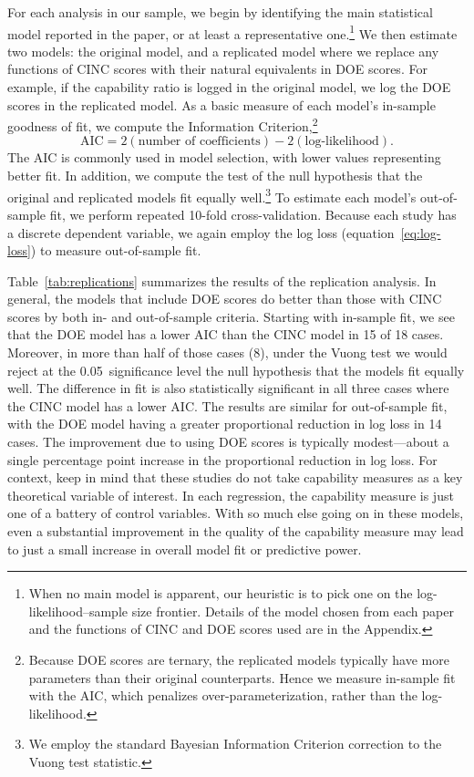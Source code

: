 For each analysis in our sample, we begin by identifying the main statistical model reported in the paper, or at least a representative one.\footnote{
  When no main model is apparent, our heuristic is to pick one on the log-likelihood--sample size frontier.
  Details of the model chosen from each paper and the functions of CINC and DOE scores used are in the Appendix.
}
We then estimate two models: the original model, and a replicated model where we replace any functions of CINC scores with their natural equivalents in DOE scores.
For example, if the capability ratio is logged in the original model, we log the DOE scores in the replicated model.
As a basic measure of each model's in-sample goodness of fit, we compute the \citet{Akaike:1974ih} Information Criterion,\footnote{
  Because DOE scores are ternary, the replicated models typically have more parameters than their original counterparts.
  Hence we measure in-sample fit with the AIC, which penalizes over-parameterization, rather than the log-likelihood.
}
\begin{displaymath}
  \text{AIC}
  =
  2(\text{number of coefficients}) - 2(\text{log-likelihood}).
\end{displaymath}
The AIC is commonly used in model selection, with lower values representing better fit.
In addition, we compute the \citet{Vuong:1989uf} test of the null hypothesis that the original and replicated models fit equally well.\footnote{
  We employ the standard Bayesian Information Criterion \citep{Schwarz:1978kh} correction to the Vuong test statistic.
}
To estimate each model's out-of-sample fit, we perform repeated 10-fold cross-validation.
Because each study has a discrete dependent variable, we again employ the log loss (equation~\eqref{eq:log-loss}) to measure out-of-sample fit.

Table~\ref{tab:replications} summarizes the results of the replication analysis.
In general, the models that include DOE scores do better than those with CINC scores by both in- and out-of-sample criteria.
Starting with in-sample fit, we see that the DOE model has a lower AIC than the CINC model in 15 of 18 cases.
Moreover, in more than half of those cases (8), under the Vuong test we would reject at the 0.05~significance level the null hypothesis that the models fit equally well.
The difference in fit is also statistically significant in all three cases where the CINC model has a lower AIC.
The results are similar for out-of-sample fit, with the DOE model having a greater proportional reduction in log loss in 14 cases.
The improvement due to using DOE scores is typically modest---about a single percentage point increase in the proportional reduction in log loss.
For context, keep in mind that these studies do not take capability measures as a key theoretical variable of interest.
In each regression, the capability measure is just one of a battery of control variables.
With so much else going on in these models, even a substantial improvement in the quality of the capability measure may lead to just a small increase in overall model fit or predictive power.

